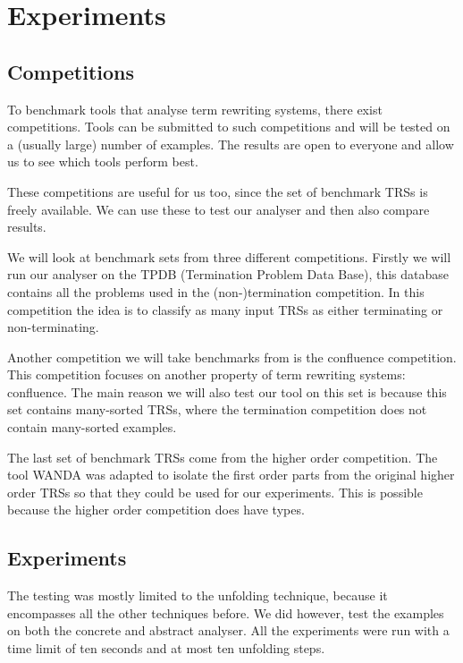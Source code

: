 \chapter{Experiments}\label{experiments}
\section{Competitions}
To benchmark tools that analyse term rewriting systems, there exist competitions. Tools can be submitted to such competitions and will be tested on a (usually large) number of examples. The results are open to everyone and allow us to see which tools perform best. 

These competitions are useful for us too, since the set of benchmark TRSs is freely available. We can use these to test our analyser and then also compare results. 

We will look at benchmark sets from three different competitions. Firstly we will run our analyser on the TPDB (Termination Problem Data Base)\cite{TermPortal}, this database contains all the problems used in the (non-)termination competition. In this competition the idea is to classify as many input TRSs as either terminating or non-terminating. 

Another competition we will take benchmarks from is the confluence competition\cite{COPS}. This competition focuses on another property of term rewriting systems: confluence. The main reason we will also test our tool on this set is because this set contains many-sorted TRSs, where the termination competition does not contain many-sorted examples.

The last set of benchmark TRSs come from the higher order competition. The tool WANDA\cite{KOP:WANDASITE} was adapted to isolate the first order parts from the original higher order TRSs so that they could be used for our experiments. This is possible because the higher order competition does have types. 

\section{Experiments}
The testing was mostly limited to the unfolding technique, because it encompasses all the other techniques before. We did however, test the examples on both the concrete and abstract analyser. All the experiments were run with a time limit of ten seconds and at most ten unfolding steps. 

